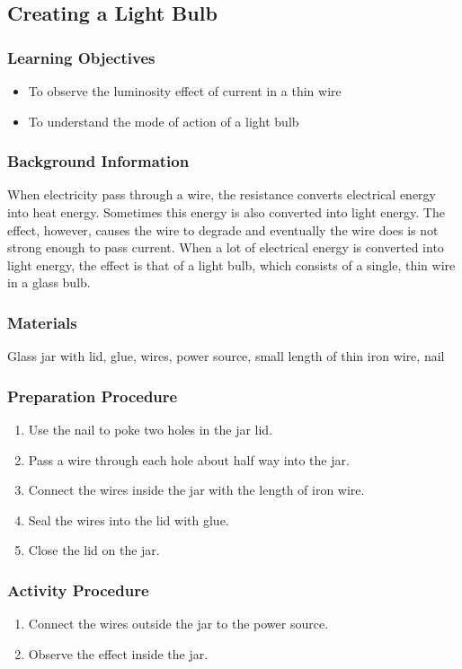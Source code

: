 \subsection{Creating a Light Bulb}

\subsubsection*{Learning Objectives}
\begin{itemize}
\item{To observe the luminosity effect of current in a thin wire}
\item{To understand the mode of action of a light bulb}
\end{itemize}

\subsubsection*{Background Information}
When electricity pass through a wire, the resistance converts electrical energy into heat energy.  Sometimes this energy is also converted into light energy.  The effect, however, causes the wire to degrade and eventually the wire does is not strong enough to pass current.  When a lot of electrical energy is converted into light energy, the effect is that of a light bulb, which consists of a single, thin wire in a glass bulb.

\subsubsection*{Materials}
Glass jar with lid, glue, wires, power source, small length of thin iron wire, nail

\subsubsection*{Preparation Procedure}
\begin{enumerate}
\item{Use the nail to poke two holes in the jar lid.}
\item{Pass a wire through each hole about half way into the jar.}
\item{Connect the wires inside the jar with the length of iron wire.}
\item{Seal the wires into the lid with glue.}
\item{Close the lid on the jar.}
\end{enumerate}

\subsubsection*{Activity Procedure}
\begin{enumerate}
\item{Connect the wires outside the jar to the power source.}
\item{Observe the effect inside the jar.}
\end{enumerate}

